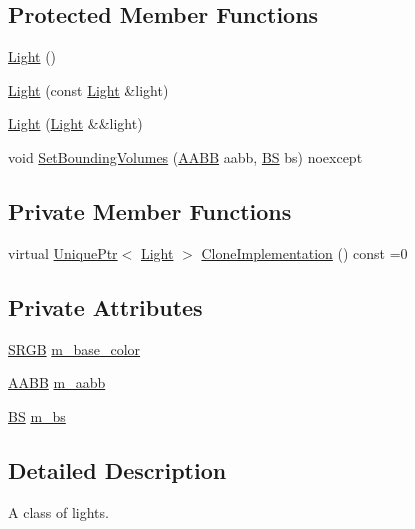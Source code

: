 \subsection*{Protected Member Functions}
\begin{DoxyCompactItemize}
\item 
\hyperlink{classmage_1_1_light_a5c1b256aef7e22faafcce7ea2fa8f858}{Light} ()
\item 
\hyperlink{classmage_1_1_light_aa91ba3fde50487939d99252c73f732cc}{Light} (const \hyperlink{classmage_1_1_light}{Light} \&light)
\item 
\hyperlink{classmage_1_1_light_a75343c11264fa27c4f166caaf0fec880}{Light} (\hyperlink{classmage_1_1_light}{Light} \&\&light)
\item 
void \hyperlink{classmage_1_1_light_a4d2c35b96e8aaa718821c79e0e123025}{Set\+Bounding\+Volumes} (\hyperlink{structmage_1_1_a_a_b_b}{A\+A\+BB} aabb, \hyperlink{structmage_1_1_b_s}{BS} bs) noexcept
\end{DoxyCompactItemize}
\subsection*{Private Member Functions}
\begin{DoxyCompactItemize}
\item 
virtual \hyperlink{namespacemage_a3316d7143a973e37adf1110f2e80ca31}{Unique\+Ptr}$<$ \hyperlink{classmage_1_1_light}{Light} $>$ \hyperlink{classmage_1_1_light_aa613d76a1ebda69efde853d15f75490c}{Clone\+Implementation} () const =0
\end{DoxyCompactItemize}
\subsection*{Private Attributes}
\begin{DoxyCompactItemize}
\item 
\hyperlink{structmage_1_1_s_r_g_b}{S\+R\+GB} \hyperlink{classmage_1_1_light_a31c237ed5716313d0c8916186bef4dab}{m\+\_\+base\+\_\+color}
\item 
\hyperlink{structmage_1_1_a_a_b_b}{A\+A\+BB} \hyperlink{classmage_1_1_light_a2c9190a763a1f37f7639a02bef01279d}{m\+\_\+aabb}
\item 
\hyperlink{structmage_1_1_b_s}{BS} \hyperlink{classmage_1_1_light_a926df9e12442c630d252fae852b8fc57}{m\+\_\+bs}
\end{DoxyCompactItemize}


\subsection{Detailed Description}
A class of lights. 

